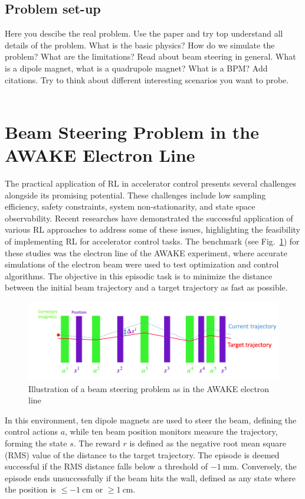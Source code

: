 \documentclass[journal,article,submit,pdftex,moreauthors]{Definitions/mdpi}
\begin{document}
\subsection{Problem set-up}
\noindent Here you descibe  the real problem. Use the paper \cite{KainVerena2023} and try top understand all details of the problem. What is the basic physics? How do we simulate the problem? What are the limitations? Read about beam steering in general. What is a dipole magnet, what is a quadrupole magnet? What is a BPM? Add citations. Try to think about different interesting scenarios you want to probe.\\\\
\section{Beam Steering Problem in the AWAKE Electron Line}
The practical application of RL in accelerator control presents several challenges alongside its promising potential. These challenges include low sampling efficiency, safety constraints, system non-stationarity, and state space observability. Recent researches have demonstrated the successful application of various RL approaches to address some of these issues\citep{Hirlaender2023, Kain2020, Kain2022, Scheinker2020}, highlighting the feasibility of implementing RL for accelerator control tasks. The benchmark (see Fig.~\ref{fig:beam_steering}) for these studies was the electron line of the AWAKE experiment, where accurate simulations of the electron beam were used to test optimization and control algorithms. The objective in this episodic task is to minimize the distance between the initial beam trajectory and a target trajectory as fast as possible.

\begin{figure}[h!]
	\centering
	\includegraphics[width=\textwidth]{Figures/AWAKE_steering_image.png}
	\caption{Illustration of a beam steering problem as in the
		AWAKE electron line}
	\label{fig:beam_steering}
\end{figure}

In this environment, ten dipole magnets are used to steer the beam, defining the control actions \(a\), while ten beam position monitors measure the trajectory, forming the state \(s\). The reward \(r\) is defined as the negative root mean square (RMS) value of the distance to the target trajectory. The episode is deemed successful if the RMS distance falls below a threshold of \(-1~\text{mm}\). Conversely, the episode ends unsuccessfully if the beam hits the wall, defined as any state where the position is \(\leq -1~\text{cm}\) or \(\geq 1~\text{cm}\). 
\end{document}
